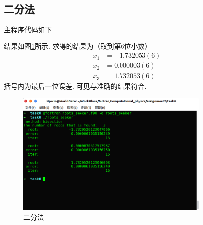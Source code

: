 \documentclass{article}
\begin{document}
	\subsection{二分法}
	主程序代码如下
	
	结果如图\ref{fig:rtr_bisection}所示. 求得的结果为（取到第6位小数）
	\[
	\begin{split}
	x_1&=-1.732053(6) \\
	x_2&=0.000003(6) \\
	x_3&=1.732053(6)
	\end{split}
	\]
	括号内为最后一位误差. 可见与准确的结果符合.
	\begin{figure}[htb]
		\centering
		\includegraphics[width=0.85\textwidth]{./utils/rtr_bisection.png}
		\caption{ 二分法\label{fig:rtr_bisection}}
	\end{figure}
\end{document}

